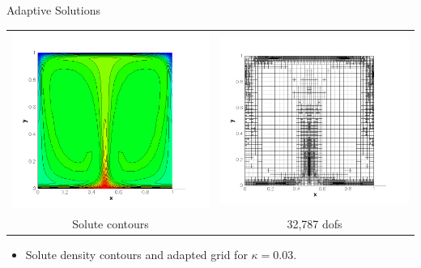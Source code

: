 \documentclass[compress,12pt]{beamer}
\begin{document}
\begin{frame}{Adaptive Solutions}
  {
    \begin{center}
      \begin{tabular}{cc} \\
	\includegraphics[width=.5\textwidth]{figures/s_adapt_kappa_0_03}&
	\includegraphics[width=.5\textwidth]{figures/grid_adapt_kappa_0_03}\\
	Solute contours &
	32,787 dofs
      \end{tabular}\end{center}
    \begin{itemize}
      
    \item Solute density contours and adapted grid for $\kappa=0.03$.
    \end{itemize}
  }


\end{frame}
\end{document}
